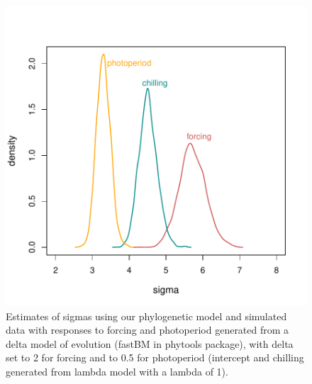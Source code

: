 \documentclass[11pt]{article}
\begin{document}
\clearpage
\begin{figure}
  \begin{center}
  \includegraphics[width=14cm]{../../analyses/phylogeny/figures/burstmodelfigquick.pdf}
  \caption{Estimates of sigmas using our phylogenetic model and simulated data with responses to forcing and photoperiod generated from a delta model of evolution (fastBM in phytools package), with delta set to 2 for forcing and to 0.5 for photoperiod (intercept and chilling generated from lambda model with a lambda of 1).}
  \label{fig:burstmodels}
  \end{center}
\end{figure}


\clearpage
\end{document}
